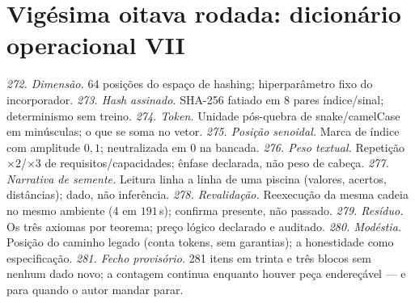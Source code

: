 \section{Vigésima oitava rodada: dicionário operacional VII}
\textit{272. Dimensão.} 64 posições do espaço de hashing; hiperparâmetro fixo do incorporador.
\textit{273. Hash assinado.} SHA-256 fatiado em 8 pares índice/sinal; determinismo sem treino.
\textit{274. Token.} Unidade pós-quebra de snake/camelCase em minúsculas; o que se soma no vetor.
\textit{275. Posição senoidal.} Marca de índice com amplitude $0{,}1$; neutralizada em 0 na bancada.
\textit{276. Peso textual.} Repetição $\times2$/$\times3$ de requisitos/capacidades; ênfase declarada, não peso de cabeça.
\textit{277. Narrativa de semente.} Leitura linha a linha de uma piscina (valores, acertos, distâncias); dado, não inferência.
\textit{278. Revalidação.} Reexecução da mesma cadeia no mesmo ambiente (4 em $191$\,s); confirma presente, não passado.
\textit{279. Resíduo.} Os três axiomas por teorema; preço lógico declarado e auditado.
\textit{280. Modéstia.} Posição do caminho legado (conta tokens, sem garantias); a honestidade como especificação.
\textit{281. Fecho provisório.} 281 itens em trinta e três blocos sem nenhum dado novo; a contagem continua enquanto houver peça endereçável --- e para quando o autor mandar parar.
